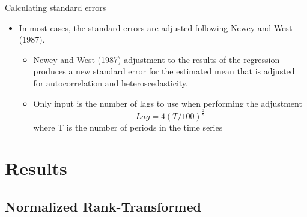 \documentclass{beamer}
\begin{document}
	\begin{frame}{Calculating standard errors}
		\begin{itemize}
			\item In most cases, the standard errors are adjusted following Newey and West (1987).
			
			
			\begin{itemize}
				\item Newey and West (1987) adjustment to the results of the
				regression produces a new standard error for the estimated mean that is adjusted for autocorrelation and heteroscedasticity.
				
				\item Only input is the number of lags to use when performing the adjustment
				\begin{equation*}
					Lag = 4(T/100)^{\frac{2}{9}}
				\end{equation*}
				where T is the number of periods in the time series
			\end{itemize}
			
			
		\end{itemize}
	\end{frame}
	
	
	\section{Results}
	
	\subsection{Normalized Rank-Transformed}
	
\end{document}
